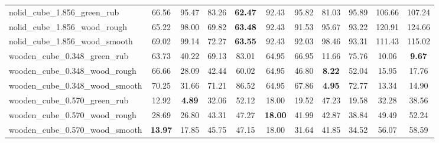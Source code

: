 \begin{table}[H]
{\begin{tabular}{l cccccccccc}
        nolid\_cube\_1.856\_green\_rub & 66.56 & 95.47 & 83.26 & \textbf{62.47} & 92.43 & 95.82 & 81.03 & 95.89 & 106.66 & 107.24 \\
        nolid\_cube\_1.856\_wood\_rough & 65.22 & 98.00 & 69.82 & \textbf{63.48} & 92.43 & 91.53 & 95.67 & 93.22 & 120.91 & 124.66 \\
        nolid\_cube\_1.856\_wood\_smooth & 69.02 & 99.14 & 72.27 & \textbf{63.55} & 92.43 & 92.03 & 98.46 & 93.31 & 111.43 & 115.02 \\
        wooden\_cube\_0.348\_green\_rub & 63.73 & 40.22 & 69.13 & 83.01 & 64.95 & 66.95 & 11.66 & 75.76 & 10.06 & \textbf{9.67} \\
        wooden\_cube\_0.348\_wood\_rough & 66.66 & 28.09 & 42.44 & 60.02 & 64.95 & 46.80 & \textbf{8.22} & 52.04 & 15.95 & 17.76 \\
        wooden\_cube\_0.348\_wood\_smooth & 70.25 & 31.66 & 71.21 & 86.52 & 64.95 & 67.86 & \textbf{4.95} & 72.77 & 13.34 & 14.90 \\
        wooden\_cube\_0.570\_green\_rub & 12.92 & \textbf{4.89} & 32.06 & 52.12 & 18.00 & 19.52 & 47.23 & 19.58 & 32.28 & 38.56 \\
        wooden\_cube\_0.570\_wood\_rough & 28.69 & 26.80 & 43.31 & 47.27 & \textbf{18.00} & 41.99 & 42.87 & 38.84 & 49.49 & 52.24 \\
        wooden\_cube\_0.570\_wood\_smooth & \textbf{13.97} & 17.85 & 45.75 & 47.15 & 18.00 & 31.64 & 41.85 & 34.52 & 56.07 & 58.59 \\
        \bottomrule
    \end{tabular}
    }
\end{table}
